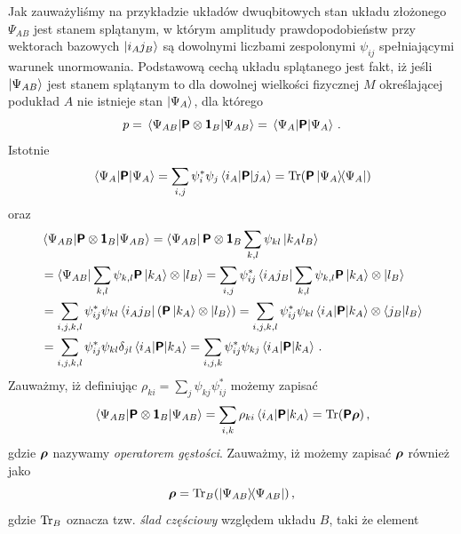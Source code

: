 \documentclass{myclass}
\begin{document}
Jak zauważyliśmy na przykładzie układów dwuqbitowych stan układu złożonego \(\Psi_{AB}\) jest stanem
splątanym, w którym amplitudy prawdopodobieństw przy wektorach bazowych \(\ket{i_Aj_B}\) są
dowolnymi liczbami zespolonymi \(\psi_{ij}\) spełniającymi warunek unormowania. Podstawową cechą
układu splątanego jest fakt, iż jeśli \(\ket{\Psi_{AB}}\) jest stanem splątanym to dla dowolnej
wielkości fizycznej \(M\) określającej podukład \(A\) nie istnieje stan \(\ket{\Psi_A}\), dla
którego
\begin{equation*}
    p = \mel{\Psi_{AB}}{\boldsymbol{\mathsf{P}}\otimes\boldsymbol{\mathsf{1}}_B}{\Psi_{AB}} = \mel{\Psi_A}{\boldsymbol{\mathsf{P}}}{\Psi_A}\,.
\end{equation*}
Istotnie
\begin{equation*}
    \mel{\Psi_A}{\oper{P}}{\Psi_A} = \sum_{i,j} \psi_i^*\psi_j \mel{i_A}{\oper{P}}{j_A} = \Tr(\oper{P}\dyad{\Psi_A})
\end{equation*}
oraz
\begin{equation*}
    \begin{split}
        &\mel{\Psi_{AB}}{\boldsymbol{\mathsf{P}}\otimes\boldsymbol{\mathsf{1}}_B}{\Psi_{AB}} = \bra{\Psi_{AB}}\boldsymbol{\mathsf{P}}\otimes\boldsymbol{\mathsf{1}}_B\sum_{k,l}\psi_{kl}\ket{k_Al_B} \\
        &= \bra{\Psi_{AB}}\sum_{k,l}\psi_{k,l}\boldsymbol{\mathsf{P}}\ket{k_A}\otimes\ket{l_B} = \sum_{i,j}\psi_{ij}^*\bra{i_Aj_B}\sum_{k,l}\psi_{k,l}\boldsymbol{\mathsf{P}}\ket{k_A}\otimes\ket{l_B} \\
        &= \sum_{i,j,k,l}\psi_{ij}^*\psi_{kl}\bra{i_Aj_B}\left(\boldsymbol{\mathsf{P}}\ket{k_A}\otimes\ket{l_B}\right) = \sum_{i,j,k,l}\psi_{ij}^*\psi_{kl}\mel{i_A}{\boldsymbol{\mathsf{P}}}{k_A}\otimes \braket{j_B}{l_B} \\
        &= \sum_{i,j,k,l}\psi_{ij}^*\psi_{kl}\delta_{jl} \mel{i_A}{\boldsymbol{\mathsf{P}}}{k_A} = \sum_{i,j,k} \psi_{ij}^*\psi_{kj} \mel{i_A}{\boldsymbol{\mathsf{P}}}{k_A}\,.
    \end{split}
\end{equation*}
Zauważmy, iż definiując \(\rho_{ki} = \sum_{j} \psi_{kj}\psi_{ij}^*\) możemy zapisać
\begin{equation*}
    \mel{\Psi_{AB}}{\oper{P}\otimes\oper{1}_B}{\Psi_{AB}} = \sum_{i,k}\rho_{ki}\mel{i_A}{\oper{P}}{k_A} = \Trace(\oper{P}\oper{\rho})\,,
\end{equation*}
gdzie \(\boldsymbol{\mathsf{\rho}}\) nazywamy \textit{operatorem gęstości}. Zauważmy, iż możemy zapisać
\(\boldsymbol{\mathsf{\rho}}\) również jako
\begin{equation*}
    \oper{\rho} = \Trace_B(\dyad{\Psi_{AB}})\,,
\end{equation*}
gdzie \(\Trace_B\) oznacza tzw. \textit{ślad częściowy} względem układu \(B\), taki że element
\end{document}
